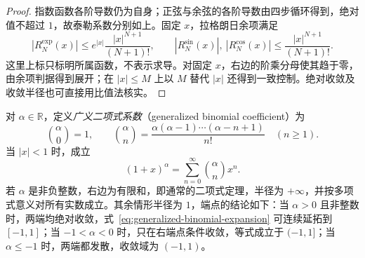 \documentclass[UTF8,12pt,a4paper,fontset=fandol]{ctexbook}
\begin{document}
\begin{proof}
指数函数各阶导数仍为自身；正弦与余弦的各阶导数由四步循环得到，绝对值不超过 $1$，故泰勒系数分别如上。固定 $x$，拉格朗日余项满足
\[
    |R_N^{\exp}(x)|\leq e^{|x|}\frac{|x|^{N+1}}{(N+1)!},
    \qquad
    |R_N^{\sin}(x)|,\ |R_N^{\cos}(x)|
       \leq\frac{|x|^{N+1}}{(N+1)!}.
\]
这里上标只标明所属函数，不表示求导。对固定 $x$，右边的阶乘分母使其趋于零，由余项判据得到展开；在 $|x|\leq M$ 上以 $M$ 替代 $|x|$ 还得到一致控制。绝对收敛及收敛半径也可直接用比值法核实。
\end{proof}

\begin{theorem}[广义二项式展开]
\label{thm:generalized-binomial-series}
对 $\alpha\in\mathbb R$，定义\emph{广义二项式系数}（generalized binomial coefficient）为
\[
    \binom\alpha0=1,\qquad
    \binom\alpha n=\frac{\alpha(\alpha-1)\cdots(\alpha-n+1)}{n!}
    \quad(n\geq1).
\]
当 $|x|<1$ 时，成立
\begin{equation}
    (1+x)^\alpha=\sum_{n=0}^\infty\binom\alpha n x^n.
    \label{eq:generalized-binomial-expansion}
\end{equation}
若 $\alpha$ 是非负整数，右边为有限和，即通常的二项式定理，半径为 $+\infty$，并按多项式意义对所有实数成立。其余情形半径为 $1$，端点的结论如下：当 $\alpha>0$ 且非整数时，两端均绝对收敛，式~\eqref{eq:generalized-binomial-expansion} 可连续延拓到 $[-1,1]$；当 $-1<\alpha<0$ 时，只在右端点条件收敛，等式成立于 $(-1,1]$；当 $\alpha\leq-1$ 时，两端都发散，收敛域为 $(-1,1)$。
\end{theorem}
\end{document}
